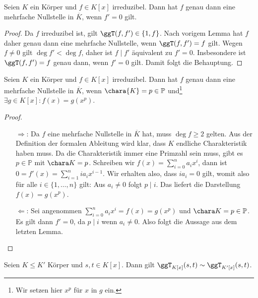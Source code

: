 \begin{lemma}\label{lemma:mehrfache-nst-bei-irreduzibel}
    Seien $K$ ein Körper und $f\in K[x]$ irreduzibel. Dann hat $f$ genau dann eine mehrfache Nullstelle in $\overline{K}$, wenn $f'=0$ gilt.
\end{lemma}

\begin{proof}
    Da $f$ irreduzibel ist, gilt $\ggT(f,f')\in\{1,f\}$. Nach vorigem Lemma hat $f$ daher genau dann eine mehrfache Nullstelle, wenn $\ggT(f,f')=f$ gilt. Wegen $f\neq 0$ gilt $\deg f'<\deg f$, daher ist $f\mid f'$ äquivalent zu $f'=0$. Insbesondere ist $\ggT(f,f')=f$ genau dann, wenn $f'=0$ gilt. Damit folgt die Behauptung.
\end{proof}

\begin{lemma}\label{lemma:mehrfache-nst-kriterium}
    Seien $K$ ein Körper und $f \in K[x]$ irreduzibel. Dann hat $f$ genau dann eine mehrfache Nullstelle in $\overline{K}$, wenn $\chara{K} = p\in\mathbb{P}$ und\footnote{Wir setzen hier $x^p$ für $x$ in $g$ ein.} $\exists g \in K[x]: f(x) = g(x^p)$.
\end{lemma}
\begin{proof}{\ }
    \begin{enumerate}
        \item[$\Rightarrow$:] Da $f$ eine mehrfache Nullstelle in $\overline{K}$ hat, muss $\deg f\geq 2$ gelten. Aus der Definition der formalen Ableitung wird klar, dass $K$ endliche Charakteristik haben muss. Da die Charakteristik immer eine Primzahl sein muss, gibt es $p\in\mathbb{P}$ mit $\chara K = p$. Schreiben wir $f(x) = \sum_{i=0}^n a_i x^i$, dann ist $0 = f'(x) = \sum_{i=1}^n i a_i x^{i-1}$. Wir erhalten also, dass $i a_i=0$ gilt, womit also für alle $i\in\{1,\ldots,n\}$ gilt: Aus $a_i \not= 0$ folgt $p \mid i$. Das liefert die Darstellung $f(x) = g(x^p)$.
        \item[$\Leftarrow$:] Sei angenommen $\sum_{i=0}^na_ix^i=f(x) = g(x^p)$ und $\chara K = p \in \mathbb{P}$. Es gilt dann $f' = 0$, da $p \mid i$ wenn $a_i \not= 0$. Also folgt die Aussage aus dem letzten Lemma.
    \end{enumerate}
\end{proof}


\begin{lemma}
    Seien $K\le K'$ Körper und $s,t\in K[x]$. Dann gilt $\ggT_{K[x]}(s,t)\sim\ggT_{K'[x]}(s,t)$.
\end{lemma}

